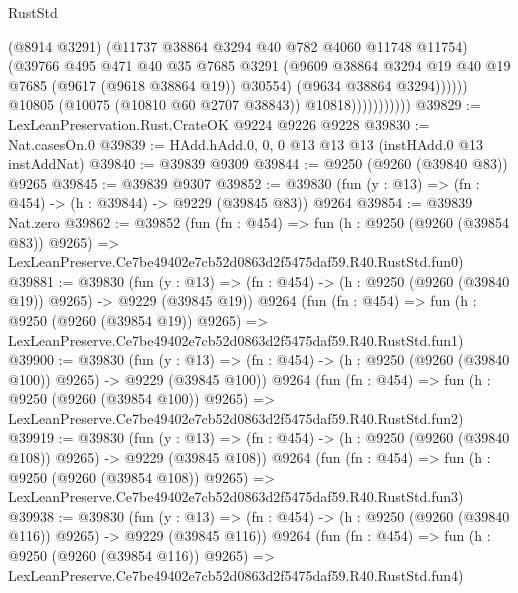 \begin{lexlean}{RustStd}
\begin{coremodule}
                                  (@8914 @3291)
                                  (@11737 @38864 @3294 @40 @782 @4060 @11748 @11754)
                                  (@39766
                                    @495
                                    @471
                                    @40
                                    @35
                                    @7685
                                    @3291
                                    (@9609
                                      @38864
                                      @3294
                                      @19
                                      @40
                                      @19
                                      @7685
                                      (@9617 (@9618 @38864 @19))
                                      @30554)
                                    (@9634 @38864 @3294))))))
                          @10805
                          (@10075 (@10810 @60 @2707 @38843))
                          @10818)))))))))))
@39829 := LexLeanPreservation.Rust.CrateOK @9224 @9226 @9228
@39830 := Nat.casesOn.{0}
@39839 := HAdd.hAdd.{0, 0, 0} @13 @13 @13 (instHAdd.{0} @13 instAddNat)
@39840 := @39839 @9309
@39844 := @9250 (@9260 (@39840 @83)) @9265
@39845 := @39839 @9307
@39852 := @39830 (fun (y : @13) => (fn : @454) -> (h : @39844) -> @9229 (@39845 @83)) @9264
@39854 := @39839 Nat.zero
@39862 := @39852
    (fun (fn : @454) =>
    fun (h : @9250 (@9260 (@39854 @83)) @9265) =>
    LexLeanPreserve.Ce7be49402e7cb52d0863d2f5475daf59.R40.RustStd.fun0)
@39881 := @39830
    (fun (y : @13) => (fn : @454) -> (h : @9250 (@9260 (@39840 @19)) @9265) -> @9229 (@39845 @19))
    @9264
    (fun (fn : @454) =>
    fun (h : @9250 (@9260 (@39854 @19)) @9265) =>
    LexLeanPreserve.Ce7be49402e7cb52d0863d2f5475daf59.R40.RustStd.fun1)
@39900 := @39830
    (fun (y : @13) => (fn : @454) -> (h : @9250 (@9260 (@39840 @100)) @9265) -> @9229 (@39845 @100))
    @9264
    (fun (fn : @454) =>
    fun (h : @9250 (@9260 (@39854 @100)) @9265) =>
    LexLeanPreserve.Ce7be49402e7cb52d0863d2f5475daf59.R40.RustStd.fun2)
@39919 := @39830
    (fun (y : @13) => (fn : @454) -> (h : @9250 (@9260 (@39840 @108)) @9265) -> @9229 (@39845 @108))
    @9264
    (fun (fn : @454) =>
    fun (h : @9250 (@9260 (@39854 @108)) @9265) =>
    LexLeanPreserve.Ce7be49402e7cb52d0863d2f5475daf59.R40.RustStd.fun3)
@39938 := @39830
    (fun (y : @13) => (fn : @454) -> (h : @9250 (@9260 (@39840 @116)) @9265) -> @9229 (@39845 @116))
    @9264
    (fun (fn : @454) =>
    fun (h : @9250 (@9260 (@39854 @116)) @9265) =>
    LexLeanPreserve.Ce7be49402e7cb52d0863d2f5475daf59.R40.RustStd.fun4)

\end{coremodule}
\end{lexlean}

